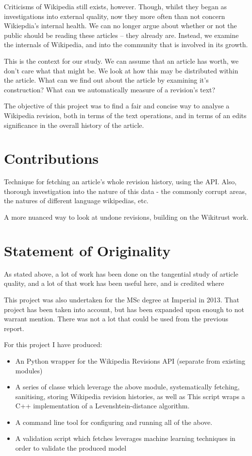 Criticisms of Wikipedia still exists, however. Though, whilst they
began as investigations into external quality, now they more often
than not concern Wikiepdia's internal health. We can no longer argue
about whether or not the public should be reading these articles --
they already are. Instead, we examine the internals of Wikipedia, and
into the community that is involved in its growth. 

This is the context for our study. We can assume that an article has
worth, we don't care what that might be. We look at how this
may be distributed within the article. What can we find out about the
article by examining it's construction? What can we automatically
measure of a revision's text?

The objective of this project was to find a fair and concise way to
analyse a Wikipedia revision, both in terms of the text operations,
and in terms of an edits significance in the overall history of the
article.

\section{Contributions}

Technique for fetching an article's whole revision history, using the
API. Also, thorough investigation into the nature of this data - the
commonly corrupt areas, the natures of different language wikipedias,
etc.

A more nuanced way to look at undone revisions, building on the
Wikitrust work. 

\section{Statement of Originality}

As stated above, a lot of work has been done on the tangential study
of article quality, and a lot of that work has been useful here, and
is credited where

This project was also undertaken for the MSc degree at Imperial in
2013. That project has been taken into account, but has been expanded
upon enough to not warrant mention. There was not a lot that could be
used from the previous report.

For this project I have produced:
\begin{itemize}
\item An Python wrapper for the Wikipedia Revisions API (separate from
  existing modules)
\item A series of classe which leverage the above module, systematically
  fetching, sanitising, storing Wikipedia revision
  histories, as well as  This script wraps a C++ implementation
  of a Levenshtein-distance algorithm.  
\item A command line tool for configuring and running all of the above. 
\item A validation script which fetches leverages machine learning techniques
 in order to validate the produced model
\end{itemize}
